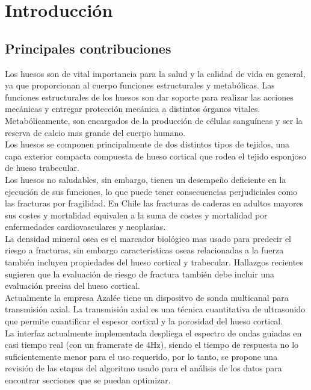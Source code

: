 \chapter{Introducci\'on}


\section{Principales contribuciones}

Los huesos son de vital importancia para la salud y la calidad de vida en general\cite{US}, ya que proporcionan al cuerpo funciones estructurales y metabólicas. Las funciones estructurales de los huesos son dar soporte para realizar las acciones mecánicas y entregar protección mecánica a distintos órganos vitales. Metabólicamente, son encargados de la producción de células sanguíneas y ser la reserva de calcio mas grande del cuerpo humano\cite{Lorincz2009}.
\\[5.5pt]
Los huesos se componen principalmente de dos distintos tipos de tejidos, una capa exterior compacta compuesta de hueso cortical que rodea el tejido esponjoso de hueso trabecular\cite{Cooper2016}.
\\[5.5pt]
Los huesos no saludables, sin embargo, tienen un desempeño deficiente en la ejecución de sus funciones, lo que puede tener consecuencias perjudiciales como las fracturas por fragilidad\cite{US}. En Chile las fracturas de caderas  en adultos mayores sus costes y mortalidad equivalen a la suma de costes y mortalidad por enfermedades cardiovasculares y neoplasias\cite{DINAMARCA-MONTECINOS2015}. 
\\[5.5pt]
La densidad mineral osea es el marcador biológico mas usado para predecir el riesgo a fracturas, sin embargo características oseas relacionadas a la fuerza también incluyen propiedades del hueso cortical y trabecular. Hallazgos recientes sugieren que la evaluación de riesgo de fractura también debe incluir una evaluación precisa del hueso cortical\cite{Bala2015}.
\\[5.5pt]
Actualmente la empresa Azalée tiene un dispositvo de sonda multicanal para transmisión axial. La transmisión axial es una técnica cuantitativa de ultrasonido que permite cuantificar el espesor cortical y la porosidad del hueso cortical. 
\\[5.5pt]
La interfaz actualmente implementada despliega el espectro de ondas guiadas en casi tiempo real (con un framerate de 4Hz), siendo el tiempo de respuesta no lo suficientemente menor para el uso requerido, por lo tanto, se propone una revisión de las etapas del algoritmo usado para el análisis de los datos para encontrar secciones que se puedan optimizar. 
\\[5.5pt]


